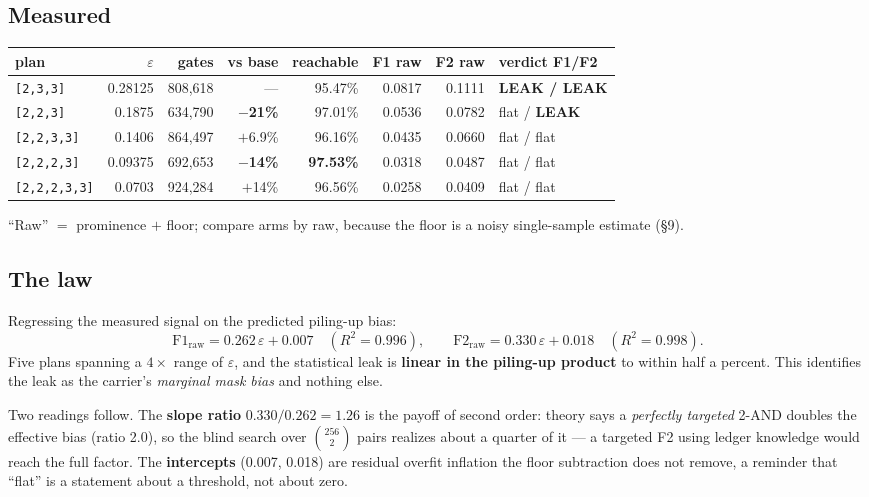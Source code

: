 \documentclass[11pt]{article}
\newcommand{\code}[1]{\texttt{#1}}
\begin{document}
\subsection{Measured}

\begin{center}
\begin{tabular}{lrrrrrrl}
\toprule
plan & $\varepsilon$ & gates & vs base & reachable & F1 raw & F2 raw & verdict F1/F2 \\
\midrule
\code{[2,3,3]}     & 0.28125 & 808{,}618 & --- & 95.47\% & 0.0817 & 0.1111 & \textbf{LEAK / LEAK} \\
\code{[2,2,3]}     & 0.1875  & 634{,}790 & \textbf{$-$21\%} & 97.01\% & 0.0536 & 0.0782 & flat / \textbf{LEAK} \\
\code{[2,2,3,3]}   & 0.1406  & 864{,}497 & $+$6.9\% & 96.16\% & 0.0435 & 0.0660 & flat / flat \\
\code{[2,2,2,3]}   & 0.09375 & 692{,}653 & \textbf{$-$14\%} & \textbf{97.53\%} & 0.0318 & 0.0487 & flat / flat \\
\code{[2,2,2,3,3]} & 0.0703  & 924{,}284 & $+$14\% & 96.56\% & 0.0258 & 0.0409 & flat / flat \\
\bottomrule
\end{tabular}
\end{center}

``Raw'' $=$ prominence $+$ floor; compare arms by raw, because the floor is a
noisy single-sample estimate (\S9).

\subsection{The law}

Regressing the measured signal on the predicted piling-up bias:
\[
  \mathrm{F1_{raw}} = 0.262\,\varepsilon + 0.007 \quad (R^2 = 0.996),
  \qquad
  \mathrm{F2_{raw}} = 0.330\,\varepsilon + 0.018 \quad (R^2 = 0.998).
\]
Five plans spanning a $4\times$ range of $\varepsilon$, and the statistical leak
is \textbf{linear in the piling-up product} to within half a percent. This
identifies the leak as the carrier's \emph{marginal mask bias} and nothing else.

Two readings follow. The \textbf{slope ratio} $0.330/0.262 = 1.26$ is the payoff
of second order: theory says a \emph{perfectly targeted} 2-AND doubles the
effective bias (ratio 2.0), so the blind search over $\binom{256}{2}$ pairs
realizes about a quarter of it --- a targeted F2 using ledger knowledge would
reach the full factor. The \textbf{intercepts} (0.007, 0.018) are residual
overfit inflation the floor subtraction does not remove, a reminder that
``flat'' is a statement about a threshold, not about zero.
\end{document}
